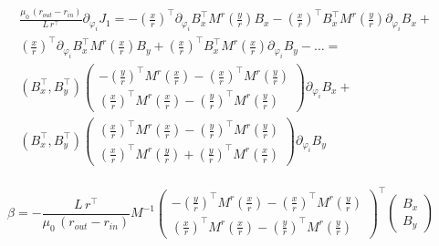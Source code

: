 \begin{align*}
&\frac{\mu_0\,\left(r_{out} - r_{in}\right)}{L\,r^\top} \partial_{\varphi_i} J_1 = - \left(\frac{x}{r}\right)^\top \partial_{\varphi_i} B_x^\top  M^r \left(\frac{y}{r}\right) B_x  - \left(\frac{x}{r}\right)^\top  B_x^\top  M^r \left(\frac{y}{r}\right) \partial_{\varphi_i} B_x  + \\
&\left(\frac{x}{r}\right)^\top  \partial_{\varphi_i} B_x^\top  M^r \left( \frac{x}{r}\right) B_y   + \left(\frac{x}{r}\right)^\top B_x^\top  M^r \left( \frac{x}{r}\right)  \partial_{\varphi_i} B_y  - \ldots = \\
&\left(B_x^\top, B_y^\top\right)\begin{pmatrix}
-\left(\frac{y}{r}\right)^\top M^r \left(\frac{x}{r}\right) - \left(\frac{x}{r}\right)^\top M^r \left(\frac{y}{r}\right) \\
\left(\frac{x}{r}\right)^\top M^r \left(\frac{x}{r}\right) - \left(\frac{y}{r}\right)^\top M^r \left(\frac{y}{r}\right) \end{pmatrix} \partial_{\varphi_i} B_x + \\
&\left(B_x^\top, B_y^\top\right)\begin{pmatrix}
\left(\frac{x}{r}\right)^\top M^r \left(\frac{x}{r}\right) - \left(\frac{y}{r}\right)^\top M^r \left(\frac{y}{r}\right) \\
\left(\frac{x}{r}\right)^\top M^r \left(\frac{y}{r}\right) + \left(\frac{y}{r}\right)^\top M^r \left(\frac{x}{r}\right) \end{pmatrix} \partial_{\varphi_i} B_y \\
\end{align*}


\begin{equation} \label{eq:56} 
\beta = -\frac{L\,r^\top}{\mu_0\,\left(r_{out} - r_{in}\right)} M^{-1} \begin{pmatrix}
-\left(\frac{y}{r}\right)^\top M^r \left(\frac{x}{r}\right) - \left(\frac{x}{r}\right)^\top M^r \left(\frac{y}{r}\right) \\
\left(\frac{x}{r}\right)^\top M^r \left(\frac{x}{r}\right) - \left(\frac{y}{r}\right)^\top M^r \left(\frac{y}{r}\right) \end{pmatrix}^{\top} \begin{pmatrix} B_x \\ B_y  \end{pmatrix}
\end{equation}

